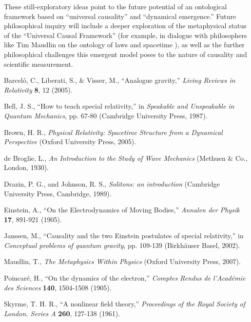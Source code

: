 \documentclass[11pt, a4paper]{article}
\begin{document}
These still-exploratory ideas point to the future potential of an ontological framework based on ``universal causality'' and ``dynamical emergence.'' Future philosophical inquiry will include a deeper exploration of the metaphysical status of the ``Universal Causal Framework'' (for example, in dialogue with philosophers like Tim Maudlin on the ontology of laws and spacetime \cite{Maudlin2007}), as well as the further philosophical challenges this emergent model poses to the nature of causality and scientific measurement.

\begin{thebibliography}{99}

Barceló, C., Liberati, S., \& Visser, M., ``Analogue gravity,'' \textit{Living Reviews in Relativity} \textbf{8}, 12 (2005).

Bell, J. S., ``How to teach special relativity,'' in \textit{Speakable and Unspeakable in Quantum Mechanics}, pp. 67-80 (Cambridge University Press, 1987).

Brown, H. R., \textit{Physical Relativity: Spacetime Structure from a Dynamical Perspective} (Oxford University Press, 2005).

de Broglie, L., \textit{An Introduction to the Study of Wave Mechanics} (Methuen \& Co., London, 1930).

Drazin, P. G., and Johnson, R. S., \textit{Solitons: an introduction} (Cambridge University Press, Cambridge, 1989).

Einstein, A., ``On the Electrodynamics of Moving Bodies,'' \textit{Annalen der Physik} \textbf{17}, 891-921 (1905).

Janssen, M., ``Causality and the two Einstein postulates of special relativity,'' in \textit{Conceptual problems of quantum gravity}, pp. 109-139 (Birkhäuser Basel, 2002).

Maudlin, T., \textit{The Metaphysics Within Physics} (Oxford University Press, 2007).

Poincaré, H., ``On the dynamics of the electron,'' \textit{Comptes Rendus de l'Académie des Sciences} \textbf{140}, 1504-1508 (1905).

Skyrme, T. H. R., ``A nonlinear field theory,'' \textit{Proceedings of the Royal Society of London. Series A} \textbf{260}, 127-138 (1961).

\end{thebibliography}
\end{document}
